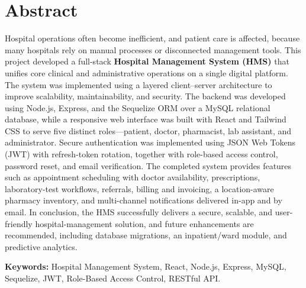 \documentclass[12pt,a4paper]{report}
\begin{document}
\chapter*{Abstract}
Hospital operations often become inefficient, and patient care is affected, because
many hospitals rely on manual processes or disconnected management tools. This
project developed a full-stack \textbf{Hospital Management System (HMS)} that unifies
core clinical and administrative operations on a single digital platform. The system
was implemented using a layered client--server architecture to improve scalability,
maintainability, and security. The backend was developed using Node.js, Express, and
the Sequelize ORM over a MySQL relational database, while a responsive web interface
was built with React and Tailwind CSS to serve five distinct roles---patient, doctor,
pharmacist, lab assistant, and administrator. Secure authentication was implemented
using JSON Web Tokens (JWT) with refresh-token rotation, together with role-based
access control, password reset, and email verification. The completed system provides
features such as appointment scheduling with doctor availability, prescriptions,
laboratory-test workflows, referrals, billing and invoicing, a location-aware pharmacy
inventory, and multi-channel notifications delivered in-app and by email. In
conclusion, the HMS successfully delivers a secure, scalable, and user-friendly
hospital-management solution, and future enhancements are recommended, including
database migrations, an inpatient/ward module, and predictive analytics.

\vspace{0.4cm}
\noindent\textbf{Keywords:} Hospital Management System, React, Node.js, Express,
MySQL, Sequelize, JWT, Role-Based Access Control, RESTful API.

\tableofcontents
\listoffigures

\end{document}

